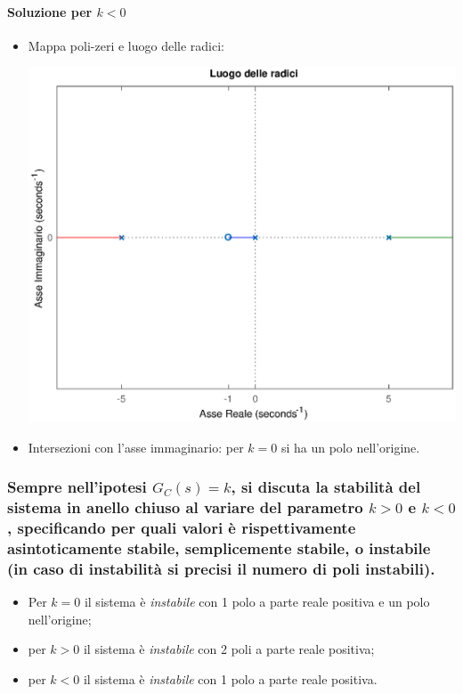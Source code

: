 \paragraph{Soluzione per \(k<0\)}
\begin{itemize}
	\item Mappa poli-zeri e luogo delle radici:
		\begin{center}\includegraphics[scale=.5]{mod1/assets/rl_ex316n.eps}\end{center}
	\item Intersezioni con l'asse immaginario: per \(k=0\) si ha un polo nell'origine.
\end{itemize}

\subsubsection{
Sempre nell'ipotesi \(G_C(s)=k\), si discuta la stabilità del sistema in anello chiuso al variare del parametro \(k>0\) e \(k<0\), specificando per quali valori è rispettivamente asintoticamente stabile, semplicemente stabile, o instabile (in caso di instabilità si precisi il numero di poli instabili).
}

\begin{itemize}
	\item Per \(k=0\) il sistema è \emph{instabile} con 1 polo a parte reale positiva e un polo nell'origine;
	\item per \(k>0\) il sistema è \emph{instabile} con 2 poli a parte reale positiva;
	\item per \(k<0\) il sistema è \emph{instabile} con 1 polo a parte reale positiva.
\end{itemize}

